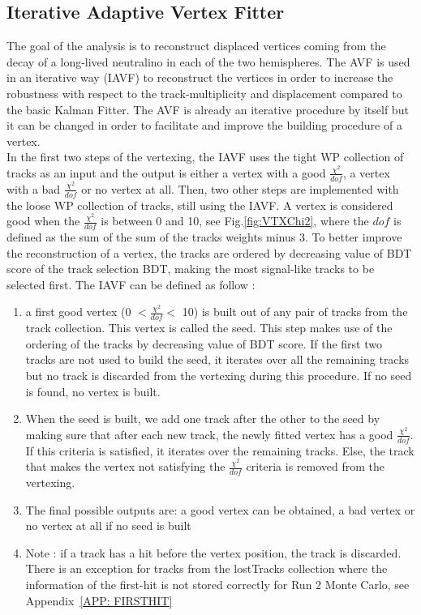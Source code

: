 \documentclass{cernatlasnote}
\begin{document}
\subsection{Iterative Adaptive Vertex Fitter}
\label{APP: IAVF}
The goal of the analysis is to reconstruct displaced vertices coming from the decay of a long-lived neutralino in each of the two hemispheres. The AVF is used in an iterative way (IAVF) to reconstruct the vertices in order to increase the robustness with respect to the track-multiplicity and displacement compared to the basic Kalman Fitter. The AVF is already an iterative procedure by itself but it can be changed in order to facilitate and improve the building procedure of a vertex. \\
In the first two steps of the vertexing, the IAVF uses the tight WP collection of tracks as an input and the output is either a vertex with a good $\frac{\chi^2}{dof}$, a vertex with a bad $\frac{\chi^2}{dof}$ or no vertex at all. Then, two other steps are implemented with the loose WP collection of tracks, still using the IAVF. A vertex is considered good when the 
$\frac{\chi^2}{dof}$ is between 0 and 10, see Fig.\ref{fig:VTXChi2}, where the $dof$ is defined as the sum of the sum of the tracks weights minus 3. To better improve the reconstruction of a vertex, the tracks are ordered by decreasing value of BDT score of the track selection BDT, making the most signal-like tracks to be selected first. The IAVF can be defined as follow :
\begin{enumerate}
    \item a first good  vertex (0 $<\frac{\chi^2}{dof}<$ 10) is built out of any pair of tracks from the track collection. This vertex is called the seed. This step makes use of the ordering of the tracks by decreasing value of BDT score. If the first two tracks are not used to build the seed, it iterates over all the remaining tracks but no track is discarded from the vertexing during this procedure. If no seed is found, no vertex is built.
    \item When the seed is built, we add one track after the other to the seed by making sure that after each new track, the newly fitted vertex has a good $\frac{\chi^2}{dof}$. If this criteria is satisfied, it iterates over the remaining tracks. Else, the track that makes the vertex not satisfying the $\frac{\chi^2}{dof}$ criteria is removed from the vertexing.
    \item The final possible outputs are: a good vertex can be obtained, a bad vertex or no vertex at all if no seed is built
    \item Note : if a track has a hit before the vertex position, the track is discarded. There is an exception for tracks from the lostTracks collection where the information of the first-hit is not stored correctly for Run 2 Monte Carlo, see Appendix~\ref{APP: FIRSTHIT} 
\end{enumerate}
\end{document}
